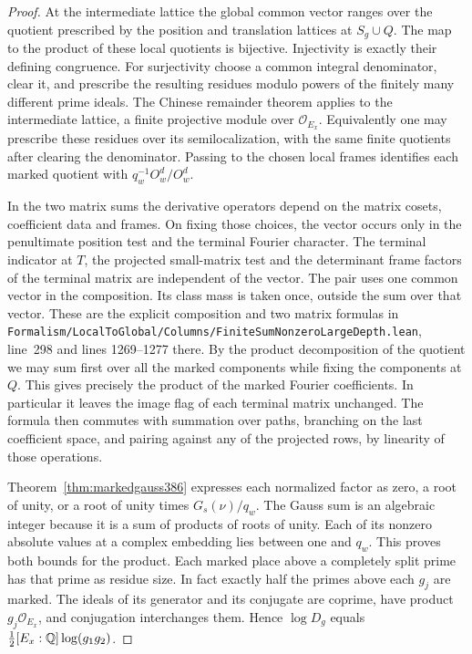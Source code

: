 \documentclass[a4paper,11pt]{article}
\theoremstyle{definition}
\theoremstyle{remark}
\newcommand{\srcloc}[2]{{\small\nolinkurl{#1.lean}}, line~#2}
\numberwithin{equation}{section}
\begin{document}
\begin{proof}
At the intermediate lattice the global common vector ranges
over the quotient prescribed by the position and translation
lattices at \(S_g\cup Q\). The map to the product of these
local quotients is bijective. Injectivity is exactly their
defining congruence. For surjectivity choose a common integral
denominator, clear it, and prescribe the resulting residues
modulo powers of the finitely many different prime ideals.
The Chinese remainder theorem applies to the intermediate
lattice, a finite projective module over \(\mathcal O_{E_x}\).
Equivalently one may prescribe these residues over its
semilocalization, with the same finite quotients after clearing
the denominator. Passing to the chosen local frames identifies
each marked quotient with \(q_w^{-1}O_w^d/O_w^d\).

In the two matrix sums the derivative operators depend on the
matrix cosets, coefficient data and frames. On fixing those
choices, the vector occurs only in the penultimate position
test and the terminal Fourier character. The terminal indicator
at \(T\), the projected small-matrix test and the determinant
frame factors of the terminal matrix are independent of the
vector. The pair uses one common vector in the composition.
Its class mass is taken once, outside the sum over that
vector. These are the explicit composition and two matrix
formulas in
\srcloc{Formalism/LocalToGlobal/Columns/FiniteSumNonzeroLargeDepth}{298}
and lines 1269--1277 there. By the product decomposition of
the quotient we may sum first over all the marked components
while fixing the components at \(Q\). This gives precisely the
product of the marked Fourier coefficients. In particular it
leaves the image flag of each terminal matrix unchanged.
The formula then commutes with summation over paths, branching
on the last coefficient space, and pairing against any of the
projected rows, by linearity of those operations.

Theorem~\ref{thm:markedgauss386} expresses each normalized
factor as zero, a root of unity, or a root of unity times
\(G_s(\nu)/q_w\). The Gauss sum is an algebraic integer
because it is a sum of products of roots of unity. Each of
its nonzero absolute values at a complex embedding lies between
one and \(q_w\). This proves both bounds for the product.
Each marked place above a completely split prime has that
prime as residue size. In fact exactly half the primes above
each \(g_j\) are marked. The ideals of its generator and its
conjugate are coprime, have product \(g_j\mathcal O_{E_x}\),
and conjugation interchanges them. Hence \(\log D_g\) equals
\(\tfrac12[E_x:\mathbb Q]\log(g_1g_2)\).


\end{proof}
\end{document}
